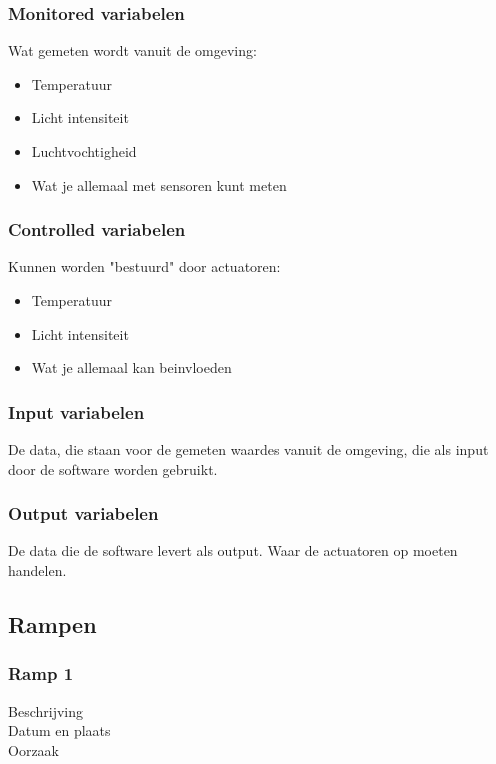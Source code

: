 \documentclass{article}%
\begin{document}
\subsubsection{Monitored variabelen}
Wat gemeten wordt vanuit de omgeving:
\begin{itemize}
  \item Temperatuur
  \item Licht intensiteit
  \item Luchtvochtigheid
  \item Wat je allemaal met sensoren kunt meten
\end{itemize}

\subsubsection{Controlled variabelen}
Kunnen worden "bestuurd" door actuatoren:
\begin{itemize}
  \item Temperatuur
  \item Licht intensiteit
  \item Wat je allemaal kan beinvloeden
\end{itemize}

\subsubsection{Input variabelen}
De data, die staan voor de gemeten waardes vanuit de omgeving, die als input door de software worden gebruikt.

\subsubsection{Output variabelen}
De data die de software levert als output. Waar de actuatoren op moeten handelen.
\subsection{Rampen}

\subsubsection{Ramp 1}
\begin{description}
\item[Beschrijving]
\item[Datum en plaats] 
\item[Oorzaak]
\end{description}
\end{document}
